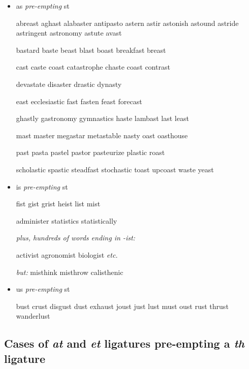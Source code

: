\begin{itemize}
\item as \emph{pre-empting} st

abreast aghast alabaster antipasto astern astir astonish astound astride astringent astronomy astute avast

bastard baste beast blast boast breakfast breast 

cast caste coast catastrophe chaste coast contrast 

devastate disaster drastic dynasty 

east ecclesiastic fast fasten feast forecast 

ghastly gastronomy gymnastics haste lambast last least 

mast master megastar metastable nasty oast oasthouse

past pasta pastel pastor pasteurize plastic roast 

scholastic spastic steadfast stochastic toast upcoast waste yeast

\item is \emph{pre-empting} st

fist gist grist heist list mist 

administer statistics statistically

\emph{plus, \emph{hundreds} of words ending in -ist:}

activist agronomist biologist \emph{etc.}

\emph{but:} misthink misthrow calisthenic



\item us \emph{pre-empting} st

bust crust disgust dust exhaust joust just lust must oust rust thrust wanderlust


\end{itemize}
\egroup


\subsection*{Cases of \emph{at} and \emph{et} ligatures pre-empting a \emph{th} ligature}

